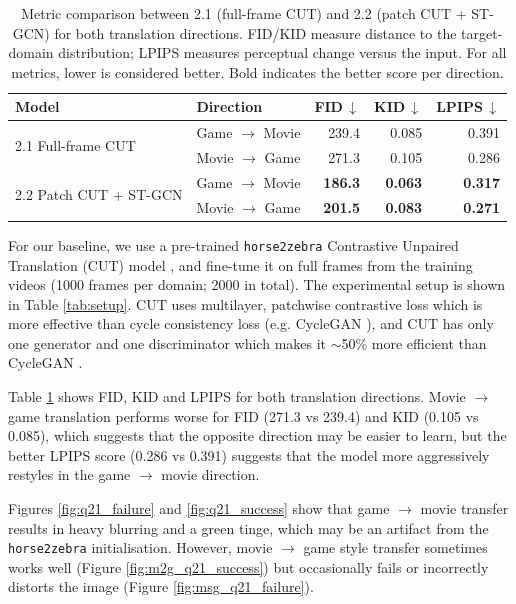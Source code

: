 \begin{table}[h]
  \centering
  \caption{Metric comparison between 2.1 (full-frame CUT) and 2.2
           (patch CUT + ST-GCN) for both translation directions.
           FID/KID measure distance to the target-domain distribution;
           LPIPS measures perceptual change versus the input.
           For all metrics, lower is considered better.
           Bold indicates the better score per direction.}
  \label{tab:metrics}
  \begin{tabular}{llrrr}
    \toprule
    Model & Direction & FID\,$\downarrow$ & KID\,$\downarrow$ & LPIPS\,$\downarrow$ \\
    \midrule
    \multirow{2}{*}{2.1 Full-frame CUT}
      & Game $\to$ Movie & 239.4 & 0.085 & 0.391 \\
      & Movie $\to$ Game & 271.3 & 0.105 & 0.286 \\
    \midrule
    \multirow{2}{*}{2.2 Patch CUT + ST-GCN}
      & Game $\to$ Movie & \textbf{186.3} & \textbf{0.063} & \textbf{0.317} \\
      & Movie $\to$ Game & \textbf{201.5} & \textbf{0.083} & \textbf{0.271} \\
    \bottomrule
  \end{tabular}
\end{table}

For our baseline, we use a pre-trained \texttt{horse2zebra} Contrastive Unpaired Translation (CUT) model \cite{park2020cut}, and fine-tune it on full frames from the training videos (1000 frames per domain; 2000 in total). The experimental setup is shown in Table \ref{tab:setup}. CUT uses multilayer, patchwise contrastive loss which is more effective than cycle consistency loss (e.g. CycleGAN \cite{CycleGAN2017, isola2017image}), and CUT has only one generator and one discriminator which makes it $\sim$50\% more efficient than CycleGAN \cite{park2020cut}.

Table \ref{tab:metrics} shows FID, KID \cite{parmar2021cleanfid} and LPIPS \cite{zhang2018perceptual} for both translation directions. Movie $\to$ game translation performs worse for FID (271.3 vs 239.4) and KID (0.105 vs 0.085), which suggests that the opposite direction may be easier to learn, but the better LPIPS score (0.286 vs 0.391) suggests that the model more aggressively restyles in the game $\to$ movie direction.

Figures \ref{fig:q21_failure} and \ref{fig:q21_success} show that game $\to$ movie transfer results in heavy blurring and a green tinge, which may be an artifact from the \texttt{horse2zebra} initialisation. However, movie $\to$ game style transfer sometimes works well (Figure \ref{fig:m2g_q21_success}) but occasionally fails or incorrectly distorts the image (Figure \ref{fig:msg_q21_failure}).


